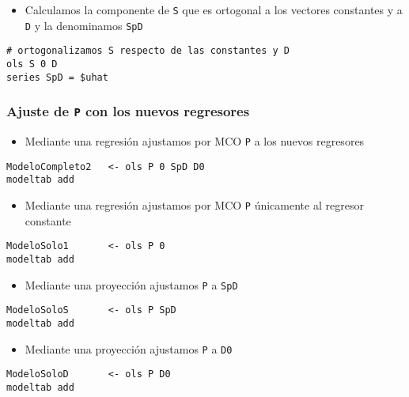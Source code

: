 \documentclass[11pt]{article}
\begin{document}
\begin{itemize}
\item Calculamos la componente de \texttt{S} que es ortogonal a los vectores
constantes y a \texttt{D} y la denominamos \texttt{SpD}
\end{itemize}

\begin{verbatim}
# ortogonalizamos S respecto de las constantes y D
ols S 0 D
series SpD = $uhat
\end{verbatim}

\subsubsection{Ajuste de \texttt{P} con los nuevos regresores}
\label{sec:org6cdea41}

\begin{itemize}
\item Mediante una regresión ajustamos por MCO \texttt{P} a los nuevos regresores
\end{itemize}

\begin{verbatim}
ModeloCompleto2   <- ols P 0 SpD D0
modeltab add
\end{verbatim}

\begin{itemize}
\item Mediante una regresión ajustamos por MCO \texttt{P} únicamente al regresor constante
\end{itemize}

\begin{verbatim}
ModeloSolo1       <- ols P 0
modeltab add
\end{verbatim}

\begin{itemize}
\item Mediante una proyección ajustamos \texttt{P} a \texttt{SpD}
\end{itemize}

\begin{verbatim}
ModeloSoloS       <- ols P SpD
modeltab add
\end{verbatim}

\begin{itemize}
\item Mediante una proyección ajustamos \texttt{P} a \texttt{D0}
\end{itemize}

\begin{verbatim}
ModeloSoloD       <- ols P D0
modeltab add
\end{verbatim}
\end{document}
